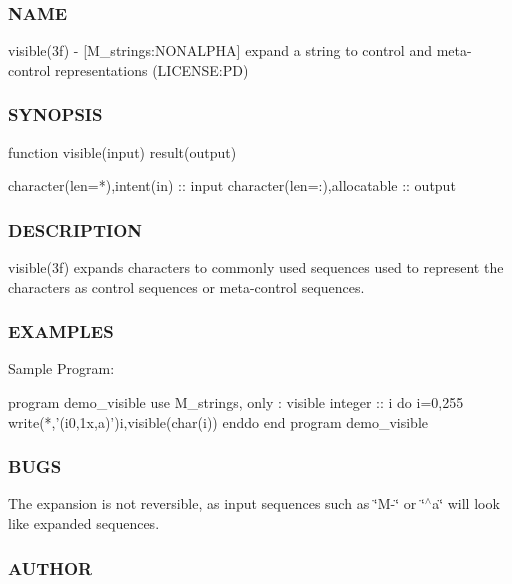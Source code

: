 \subsubsection*{N\+A\+ME}

visible(3f) -\/ \mbox{[}M\+\_\+strings\+:N\+O\+N\+A\+L\+P\+HA\mbox{]} expand a string to control and meta-\/control representations (L\+I\+C\+E\+N\+SE\+:PD) 

\subsubsection*{S\+Y\+N\+O\+P\+S\+IS}

\begin{DoxyVerb}function visible(input) result(output)

 character(len=*),intent(in)           :: input
 character(len=:),allocatable          :: output
\end{DoxyVerb}
 \subsubsection*{D\+E\+S\+C\+R\+I\+P\+T\+I\+ON}

\begin{DoxyVerb} visible(3f) expands characters to commonly used sequences used to represent the characters
 as control sequences or meta-control sequences.
\end{DoxyVerb}


\subsubsection*{E\+X\+A\+M\+P\+L\+ES}

Sample Program\+: \begin{DoxyVerb} program demo_visible
 use M_strings, only : visible
 integer :: i
    do i=0,255
       write(*,'(i0,1x,a)')i,visible(char(i))
    enddo
 end program demo_visible
\end{DoxyVerb}
 \subsubsection*{B\+U\+GS}

The expansion is not reversible, as input sequences such as \char`\"{}\+M-\/\char`\"{} or \char`\"{}$^\wedge$a\char`\"{} will look like expanded sequences.

\subsubsection*{A\+U\+T\+H\+OR}

